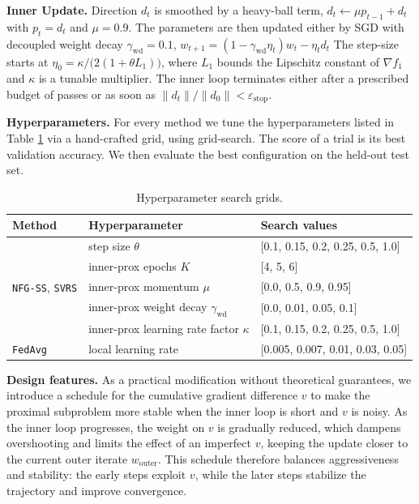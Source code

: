 \documentclass{article}
\begin{document}
\textbf{Inner Update.}
Direction $d_{t}$ is smoothed by a heavy-ball term, $d_{t}\!\leftarrow\!\mu p_{t-1}+d_{t}$ with $p_{t}=d_{t}$ and $\mu=0.9$. The parameters are then updated either by SGD with decoupled weight decay $\gamma_{\mathrm{wd}}=0.1$,
$w_{t+1}=(1-\gamma_{\mathrm{wd}}\eta_{t})w_{t}-\eta_{t}d_{t}$
The step-size starts at $\eta_{0}=\kappa/\!\bigl(2(1+\theta L_{1})\bigr)$, where $L_{1}$ bounds the Lipschitz constant of $\nabla f_{1}$ and $\kappa$ is a tunable multiplier. The inner loop terminates either after a prescribed budget of passes or as soon as $\|d_{t}\|/\|d_{0}\|<\varepsilon_{\mathrm{stop}}$.


\textbf{Hyperparameters.}
For every method we tune the hyperparameters listed in
Table \ref{tab:hyper-grid} via a hand-crafted grid, using grid-search. The score of a trial is its best validation accuracy. We then evaluate the best configuration on the
held-out test set.

\begin{table}[h]
\centering
\begin{tabular}{lll}
\toprule
Method & Hyperparameter & Search values \\
\midrule
\multirow{5}{*}{\texttt{NFG-SS}, \texttt{SVRS}}
  & step size $\theta$           & [0.1, 0.15, 0.2, 0.25, 0.5, 1.0] \\
  & inner-prox epochs $K$    & [4, 5, 6] \\
  & inner-prox momentum $\mu$     & [0.0, 0.5, 0.9, 0.95] \\
  & inner-prox weight decay $\gamma_{\mathrm{wd}}$   & [0.0, 0.01, 0.05, 0.1] \\
  & inner-prox learning rate factor $\kappa$    & [0.1, 0.15, 0.2, 0.25, 0.5, 1.0] \\
\midrule
\multirow{1}{*}{\texttt{FedAvg}}
  & local learning rate          & [0.005, 0.007, 0.01, 0.03, 0.05] \\
\bottomrule
\end{tabular}
\caption{Hyperparameter search grids.}
\label{tab:hyper-grid}
\end{table}

\textbf{Design features.} As a practical modification without theoretical guarantees, we introduce a schedule for the cumulative gradient difference $v$ to make the proximal subproblem more stable when the inner loop is short and $v$ is noisy. As the inner loop progresses, the weight on $v$ is gradually reduced, which dampens overshooting and limits the effect of an imperfect $v$, keeping the update closer to the current outer iterate $w_{\mathrm{outer}}$. This schedule therefore balances aggressiveness and stability: the early steps exploit $v$, while the later steps stabilize the trajectory and improve convergence.
\end{document}
